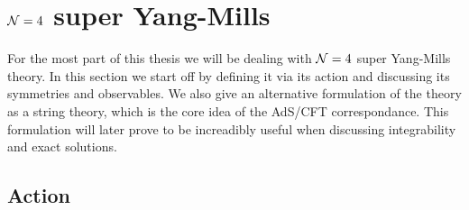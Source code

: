 
\section{$\mathcal{N}=4$ super Yang-Mills}

For the most part of this thesis we will be dealing with $\mathcal{N}=4$ super Yang-Mills theory. 
In this section we start off by defining it via its action and discussing its symmetries and observables. 
We also give an alternative formulation of the theory as a string theory, which is the core idea of the AdS/CFT correspondance. 
This formulation will later prove to be increadibly useful when discussing integrability and exact solutions.

\subsection{Action}


